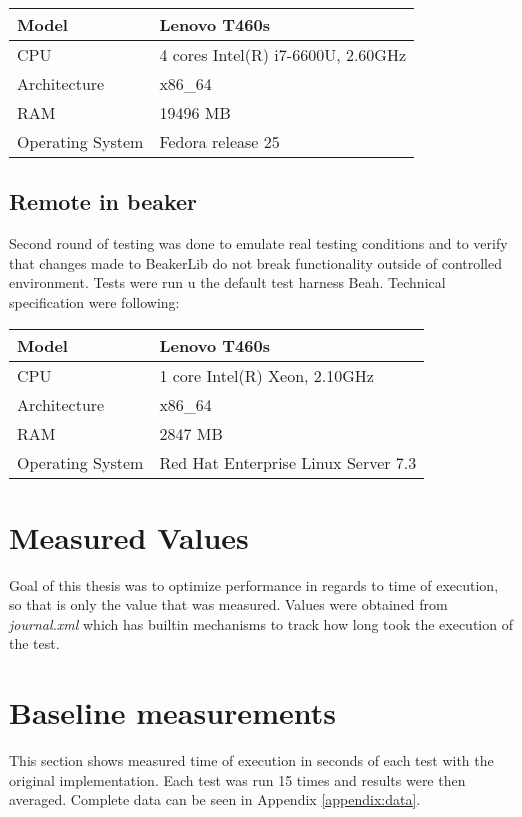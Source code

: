 \begin{center}
    \begin{tabular}{| l | l |}
    \hline
    Model & Lenovo T460s \\ \hline
    CPU & 4 cores Intel(R) i7-6600U, 2.60GHz \\ \hline
    Architecture & x86\_64 \\ \hline
    RAM & 19496 MB   \\ \hline
    Operating System & Fedora release 25 \\ \hline
    \end{tabular}
\end{center}

\subsection{Remote in beaker}
Second round of testing was done to emulate real testing conditions and to verify that changes made to BeakerLib do not break functionality outside of controlled environment. Tests were run u the default test harness Beah. Technical specification were following:

\begin{center}
    \begin{tabular}{| l | l |}
    \hline
    Model & Lenovo T460s \\ \hline
    CPU & 1 core Intel(R) Xeon, 2.10GHz \\ \hline
    Architecture & x86\_64 \\ \hline
    RAM & 2847 MB   \\ \hline
    Operating System & Red Hat Enterprise Linux Server 7.3 \\ \hline
    \end{tabular}
\end{center}


\section{Measured Values} %
Goal of this thesis was to optimize performance in regards to time of execution, so that is only the value that was measured. Values were obtained from \textit{journal.xml} which has builtin mechanisms to track how long took the execution of the test.

\section{Baseline measurements}
This section shows measured time of execution in seconds of each test with the original implementation. Each test was run 15 times and results were then averaged. Complete data can be seen in Appendix \ref{appendix:data}.

